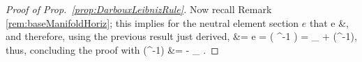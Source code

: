 \documentclass[a4paper,oneside,11pt,bibliography=totoc]{scrartcl}
\def\bas#1\eas{\begin{align*}#1\end{align*}}
\theoremstyle{plain}
\theoremstyle{remark}
\theoremstyle{definition}
\begin{document}
\begin{proof}[Proof of Prop.\ \ref{prop:DarbouxLeibnizRule}]

Now recall Remark \ref{rem:baseManifoldHoriz}; this implies for the neutral element section $e$ that
\bas
\Delta e
&,
\eas
and therefore, using the previous result just derived,
\bas
0
&=
\Delta e
=
\Delta \mleft( \sigma \sigma^{-1} \mright)
=
_{\sigma} \circ \Delta \sigma
	+ \Delta\mleft(\sigma^{-1}\mright),
\eas
thus, concluding the proof with
\bas
\Delta\mleft(\sigma^{-1}\mright)
&=
- _{\sigma} \circ \Delta \sigma.
\eas
\end{proof}
\end{document}
